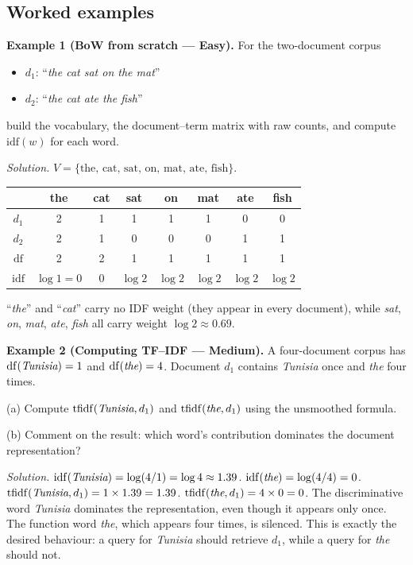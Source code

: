 \subsection{Worked examples}

\textbf{Example 1 (BoW from scratch --- Easy).}
For the two-document corpus
\begin{itemize}
    \item $d_1$: ``\emph{the cat sat on the mat}''
    \item $d_2$: ``\emph{the cat ate the fish}''
\end{itemize}
build the vocabulary, the document--term matrix with raw counts, and compute $\mathrm{idf}(w)$ for each word.

\textit{Solution.} $V = \{\text{the, cat, sat, on, mat, ate, fish}\}$.
\begin{center}
\begin{tabular}{|c|ccccccc|}
\hline
& the & cat & sat & on & mat & ate & fish \\
\hline
$d_1$ & 2 & 1 & 1 & 1 & 1 & 0 & 0 \\
$d_2$ & 2 & 1 & 0 & 0 & 0 & 1 & 1 \\
\hline
$\mathrm{df}$ & 2 & 2 & 1 & 1 & 1 & 1 & 1 \\
$\mathrm{idf}$ & $\log 1=0$ & $0$ & $\log 2$ & $\log 2$ & $\log 2$ & $\log 2$ & $\log 2$ \\
\hline
\end{tabular}
\end{center}
``\emph{the}'' and ``\emph{cat}'' carry no IDF weight (they appear in every document), while \emph{sat}, \emph{on}, \emph{mat}, \emph{ate}, \emph{fish} all carry weight $\log 2 \approx 0.69$.

\medskip

\textbf{Example 2 (Computing TF--IDF --- Medium).}
A four-document corpus has $\mathrm{df}(\emph{Tunisia}) = 1$ and $\mathrm{df}(\emph{the}) = 4$. Document $d_1$ contains \emph{Tunisia} once and \emph{the} four times.

(a) Compute $\mathrm{tfidf}(\emph{Tunisia}, d_1)$ and $\mathrm{tfidf}(\emph{the}, d_1)$ using the unsmoothed formula.

(b) Comment on the result: which word's contribution dominates the document representation?

\textit{Solution.}
$\mathrm{idf}(\emph{Tunisia}) = \log(4/1) = \log 4 \approx 1.39$. $\mathrm{idf}(\emph{the}) = \log(4/4) = 0$.
$\mathrm{tfidf}(\emph{Tunisia}, d_1) = 1 \times 1.39 = 1.39$. $\mathrm{tfidf}(\emph{the}, d_1) = 4 \times 0 = 0$.
The discriminative word \emph{Tunisia} dominates the representation, even though it appears only once. The function word \emph{the}, which appears four times, is silenced. This is exactly the desired behaviour: a query for \emph{Tunisia} should retrieve $d_1$, while a query for \emph{the} should not.

